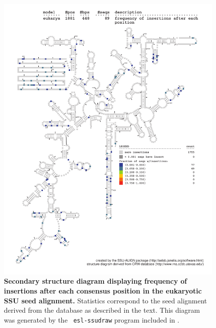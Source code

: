 \begin{figure}
\begin{center}
\includegraphics[width=5.7in]{Figures/eukarya-0p1-ifreq}
\end{center}
\caption[Secondary structure diagram displaying frequency of insertions
  after each consensus position in the eukaryotic SSU seed
  alignment]{\textbf{Secondary structure diagram displaying frequency
  of insertions after each consensus position in the eukaryotic SSU seed
  alignment.} Statistics correspond to the  seed
  alignment derived from the  database \cite{CannoneGutell02}
  as described in the text. This diagram was generated by the {\tt
  esl-ssudraw} program included in .}
\label{fig:eukifreq}
\end{figure}

